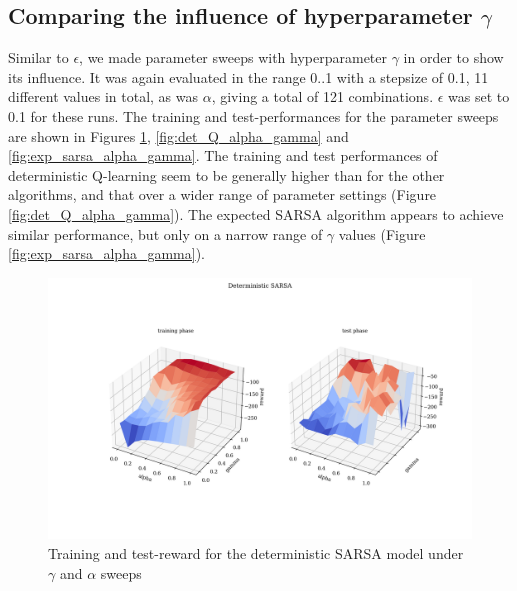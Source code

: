 \subsection{Comparing the influence of hyperparameter $\gamma$}
Similar to $\epsilon$, we made parameter sweeps with hyperparameter $\gamma$ in order to show its influence. It was again evaluated in the range 0..1 with a stepsize of 0.1, 11 different values in total, as was $\alpha$, giving a total of 121 combinations. $\epsilon$ was set to 0.1 for these runs. The training and test-performances for the parameter sweeps are shown in Figures \ref{fig:det_sarsa_alpha_gamma}, \ref{fig:det_Q_alpha_gamma} and \ref{fig:exp_sarsa_alpha_gamma}.
The training and test performances of deterministic Q-learning seem to be generally higher than for the other algorithms, and that over a wider range of parameter settings (Figure \ref{fig:det_Q_alpha_gamma}). The  expected SARSA algorithm appears to achieve similar performance, but only on a narrow range of $\gamma$ values (Figure \ref{fig:exp_sarsa_alpha_gamma}).


\begin{figure}[H]
    \centering
    \includegraphics[width=1\linewidth]{../plots/det_sarsa_alpha_gamma.png}  
    \caption{Training and test-reward for the deterministic SARSA model under $\gamma$ and $\alpha$ sweeps}
    \label{fig:det_sarsa_alpha_gamma}
\end{figure}



